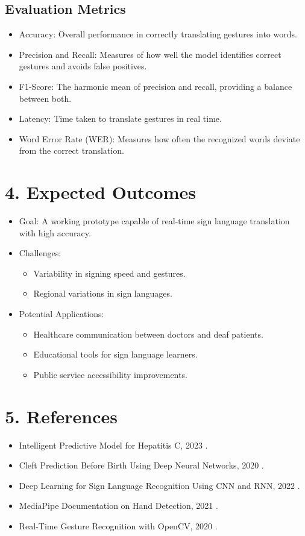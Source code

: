 \documentclass{article}
\begin{document}
\subsection*{Evaluation Metrics} 
\begin{itemize}
    \item Accuracy: Overall performance in correctly translating gestures into words.
    \item Precision and Recall: Measures of how well the model identifies correct gestures and avoids false positives.
    \item F1-Score: The harmonic mean of precision and recall, providing a balance between both.
    \item Latency: Time taken to translate gestures in real time.
    \item Word Error Rate (WER): Measures how often the recognized words deviate from the correct translation.
\end{itemize}

\section*{4. Expected Outcomes} 
\begin{itemize}
    \item Goal: A working prototype capable of real-time sign language translation with high accuracy.
    \item Challenges:
        \begin{itemize}
            \item Variability in signing speed and gestures.
            \item Regional variations in sign languages.
        \end{itemize}
    \item Potential Applications:
        \begin{itemize}
            \item Healthcare communication between doctors and deaf patients.
            \item Educational tools for sign language learners.
            \item Public service accessibility improvements.
        \end{itemize}
\end{itemize}

\section*{5. References} 
\begin{itemize}
    \item Intelligent Predictive Model for Hepatitis C, 2023 \cite{ref1}.
    \item Cleft Prediction Before Birth Using Deep Neural Networks, 2020 \cite{ref2}.
    \item Deep Learning for Sign Language Recognition Using CNN and RNN, 2022 \cite{ref3}.
    \item MediaPipe Documentation on Hand Detection, 2021 \cite{ref4}.
    \item Real-Time Gesture Recognition with OpenCV, 2020 \cite{ref5}.
\end{itemize}
\end{document}
